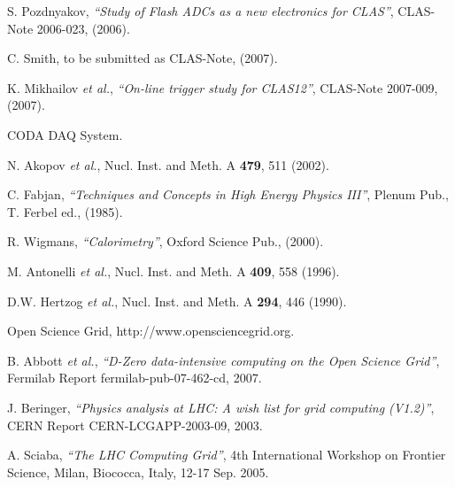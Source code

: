 \begin{thebibliography}{199}
%
%

S. Pozdnyakov, {\it ``Study of Flash ADCs as a new electronics for CLAS''}, 
CLAS-Note 2006-023, (2006).

C. Smith, to be submitted as CLAS-Note, (2007).

K. Mikhailov {\it et al.}, {\it ``On-line trigger study for CLAS12''}, 
CLAS-Note 2007-009, (2007).

CODA DAQ System.

%
%

N. Akopov {\it et al.}, Nucl. Inst. and Meth. A {\bf 479}, 511 (2002).

C. Fabjan, {\it ``Techniques and Concepts in High Energy Physics III''}, 
Plenum Pub., T. Ferbel ed., (1985).

R. Wigmans, {\it ``Calorimetry''}, Oxford Science Pub., (2000).

M. Antonelli {\it et al.}, Nucl. Inst. and Meth. A {\bf 409}, 558 (1996).

D.W. Hertzog {\it et al.}, Nucl. Inst. and Meth. A {\bf 294}, 446 (1990).

%
%

Open Science Grid, http://www.opensciencegrid.org.

B. Abbott {\it et al.}, {\it ``D-Zero data-intensive computing on the 
Open Science Grid''}, Fermilab Report fermilab-pub-07-462-cd, 2007.

J. Beringer, {\it ``Physics analysis at LHC: A wish list for grid 
computing (V1.2)''}, CERN Report CERN-LCGAPP-2003-09, 2003.

A. Sciaba, {\it ``The LHC Computing Grid''}, 4th International Workshop
on Frontier Science, Milan, Biococca, Italy, 12-17 Sep. 2005.









\end{thebibliography}
